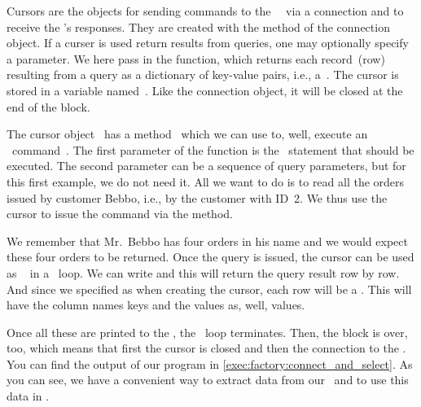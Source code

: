 Cursors are the objects for sending commands to the \postgresql\ \server\ via a connection and to receive the \server's responses.
They are created with the  method of the connection object.
If a curser is used return results from queries, one may optionally specify a  parameter.
We here pass in the  function, which returns each record~(row) resulting from a query as a dictionary of key-value pairs, i.e., a~.
The cursor is stored in a variable named~.
Like the connection object, it will be closed at the end of the  block.

The cursor object~ has a method~ which we can use to, well, execute an \sql\ command~\cite{PEP249}.
The first parameter of the function is the \sql\ statement that should be executed.
The second parameter can be a sequence of query parameters, but for this first example, we do not need it.
All we want to do is to read all the orders issued by customer Bebbo, i.e., by the customer with ID~2.
We thus use the cursor  to issue the command  via the  method.

We remember that Mr.~Bebbo has four orders in his name and we would expect these four orders to be returned.
Once the query is issued, the cursor can be used as ~\cite{PEP234} in a ~loop.
We can write  and this will return the query result row by row.
And since we specified  as  when creating the cursor, each row will be a .
This  will have the column names keys and the values as, well, values.

Once all these  are printed to the , the ~loop terminates.
Then, the  block is over, too, which means that first the cursor is closed and then the connection to the \db.
You can find the output of our program in \cref{exec:factory:connect_and_select}.
As you can see, we have a convenient way to extract data from our \db\ and to use this data in \python.

